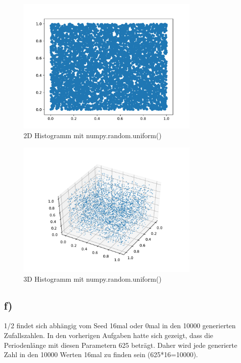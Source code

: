 \begin{figure}[H]
  \centering
  \includegraphics[width=0.8\textwidth]{nr8_d_npuni_2D_seed=0.2.pdf}
  \caption{2D Histogramm mit numpy.random.uniform()}
\end{figure}

\begin{figure}[H]
  \centering
  \includegraphics[width=0.8\textwidth]{nr8_d_npuni_3D_seed=0.2.pdf}
  \caption{3D Histogramm mit numpy.random.uniform()}
\end{figure}

\subsection{f)}

1/2 findet sich abhängig vom Seed 16mal oder 0mal
in den 10000 generierten Zufallszahlen.
In den vorherigen Aufgaben hatte sich gezeigt, dass 
die Periodenlänge mit diesen Parametern 625 beträgt.
Daher wird jede generierte Zahl in den 10000
Werten 16mal zu finden sein (625*16=10000).


